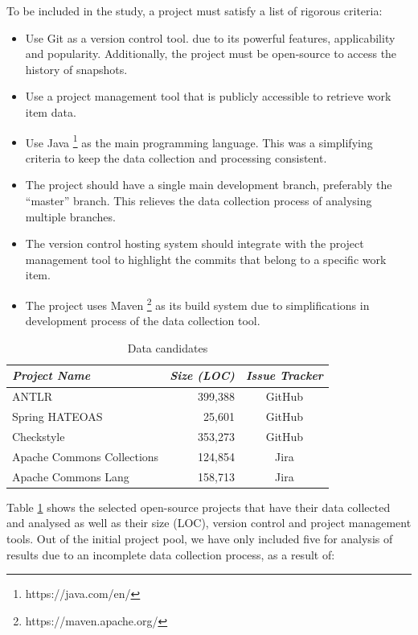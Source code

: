 \documentclass{mpaper}
\begin{document}
To be included in the study, a project must satisfy a list of rigorous criteria:

\begin{itemize}
  \item Use Git as a version control tool. due to its powerful features,
  applicability and popularity. Additionally, the project must be open-source to
  access the history of snapshots.
  \item Use a project management tool that is publicly accessible to retrieve
  work item data.
  \item Use Java \footnote{https://java.com/en/} as the main programming
  language. This was a simplifying criteria to keep the data collection and
  processing consistent.
  \item The project should have a single main development branch, preferably the
  ``master'' branch. This relieves the data collection process of analysing
  multiple branches.
  \item The version control hosting system should integrate with the project
  management tool to highlight the commits that belong to a specific work item.
  \item The project uses Maven \footnote{https://maven.apache.org/} as its build
  system due to simplifications in development process of the data collection
  tool.
\end{itemize}

\begin{table}
	\begin{tabular}{|l|r|c|}
    \hline
		\emph{Project Name}        & \emph{Size (LOC)} & \emph{Issue Tracker}  \\ \hline \hline
		ANTLR                      & 399,388            & GitHub               \\ \hline
		Spring HATEOAS             & 25,601             & GitHub               \\ \hline
		Checkstyle                 & 353,273            & GitHub               \\ \hline
		Apache Commons Collections & 124,854            & Jira                 \\ \hline
		Apache Commons Lang        & 158,713            & Jira                 \\ \hline
	\end{tabular}
	\caption{\label{tab-data-candidates} Data candidates}
\end{table}

Table \ref{tab-data-candidates} shows the selected open-source projects that
have their data collected and analysed as well as their size (LOC), version
control and project management tools. Out of the initial project pool, we have
only included five for analysis of results due to an incomplete data collection
process, as a result of:
\end{document}
